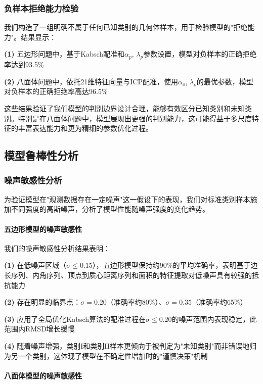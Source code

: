 \subsubsection{负样本拒绝能力检验}

我们构造了一组明确不属于任何已知类别的几何体样本，用于检验模型的"拒绝能力"。结果显示：

\textbf{(1)} 五边形问题中，基于Kabsch配准和$\alpha_p$, $\lambda_p$参数设置，模型对负样本的正确拒绝率达到93.5\%

\textbf{(2)} 八面体问题中，依托21维特征向量与ICP配准，使用$\alpha_o$, $\lambda_o$的最优参数，模型对负样本的正确拒绝率高达96.5\%

这些结果验证了我们模型的判别边界设计合理，能够有效区分已知类别和未知类别。特别是在八面体问题中，模型展现出更强的判别能力，这可能得益于多尺度特征的丰富表达能力和更为精细的参数优化过程。

\subsection{模型鲁棒性分析}

\subsubsection{噪声敏感性分析}

为验证模型在"观测数据存在一定噪声"这一假设下的表现，我们对标准类别样本施加不同强度的高斯噪声，分析了模型性能随噪声强度的变化趋势。

\paragraph{五边形模型的噪声敏感性}

我们的噪声敏感性分析结果表明：

\textbf{(1)} 在低噪声区域（$\sigma \leq 0.15$），五边形模型保持约90\%的平均准确率，表明基于边长序列、内角序列、顶点到质心距离序列和面积的特征提取对低噪声具有较强的抵抗能力

\textbf{(2)} 存在明显的临界点：$\sigma = 0.20$（准确率约80\%）、$\sigma = 0.35$（准确率约65\%）

\textbf{(3)} 应用了全局优化Kabsch算法的配准过程在$\sigma \leq 0.20$的噪声范围内表现稳定，此范围内RMSD增长缓慢

\textbf{(4)} 随着噪声增强，类别I和类别II样本更倾向于被判定为"未知类别"而非错误地归为另一个类别，这体现了模型在不确定性增加时的"谨慎决策"机制

\paragraph{八面体模型的噪声敏感性}

